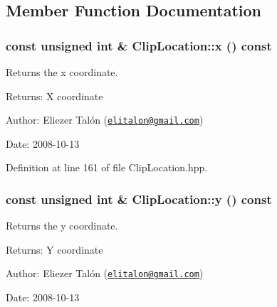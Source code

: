 \subsection{Member Function Documentation}
\hypertarget{class_clip_location_6dd58945e53e1d04ae736dafb3c43576}{
\subsubsection[x]{\setlength{\rightskip}{0pt plus 5cm}const unsigned int \& ClipLocation::x () const}}
\label{class_clip_location_6dd58945e53e1d04ae736dafb3c43576}


Returns the x coordinate. 

\begin{Desc}
\item[Returns:]X coordinate\end{Desc}
\begin{Desc}
\item[Author:]Eliezer Talón (\href{mailto:elitalon@gmail.com}{\tt elitalon@gmail.com}) \end{Desc}
\begin{Desc}
\item[Date:]2008-10-13 \end{Desc}


Definition at line 161 of file ClipLocation.hpp.\hypertarget{class_clip_location_f80b2bfd8f35cb5e0a6e02c73f21695b}{
\subsubsection[y]{\setlength{\rightskip}{0pt plus 5cm}const unsigned int \& ClipLocation::y () const}}
\label{class_clip_location_f80b2bfd8f35cb5e0a6e02c73f21695b}


Returns the y coordinate. 

\begin{Desc}
\item[Returns:]Y coordinate\end{Desc}
\begin{Desc}
\item[Author:]Eliezer Talón (\href{mailto:elitalon@gmail.com}{\tt elitalon@gmail.com}) \end{Desc}
\begin{Desc}
\item[Date:]2008-10-13 \end{Desc}


